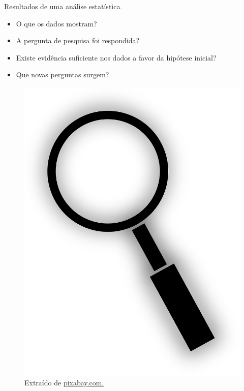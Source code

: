 \documentclass[
  ignorenonframetext,
  serif,
  professionalfont,
  usenames,
  dvipsnames,
  aspectratio = 169]{beamer}
\providecommand{\tightlist}{%
  \setlength{\itemsep}{0pt}\setlength{\parskip}{0pt}}
\renewcommand{\tightlist}{%
  \setlength{\itemsep}{0\baselineskip}
  \setlength{\parskip}{0.25\baselineskip}
}
\def\beginAHalfColumn{\begin{minipage}{0.49\textwidth}}%
\def\endColumns{\end{minipage}}%
\begin{document}
\begin{frame}{Resultados de uma análise estatística}
\protect\hypertarget{resultados-de-uma-anuxe1lise-estatuxedstica}{}
\beginAHalfColumn

\begin{itemize}
\tightlist
\item
  O que os dados mostram?
\item
  A pergunta de pesquisa foi respondida?
\item
  Existe evidência suficiente nos dados a favor da hipótese inicial?
\item
  Que novas perguntas surgem?
\end{itemize}

\endColumns
\beginAHalfColumn

\begin{figure}

{\centering \includegraphics[width=0.35\linewidth]{./img/lupa} 

}

\caption{Extraído de \href{https://pixabay.com/pt/vectors/lupa-procurar-ampliar-encontrar-155170/}{pixabay.com.}}\label{fig:unnamed-chunk-6}
\end{figure}

\endColumns
\end{frame}
\end{document}
